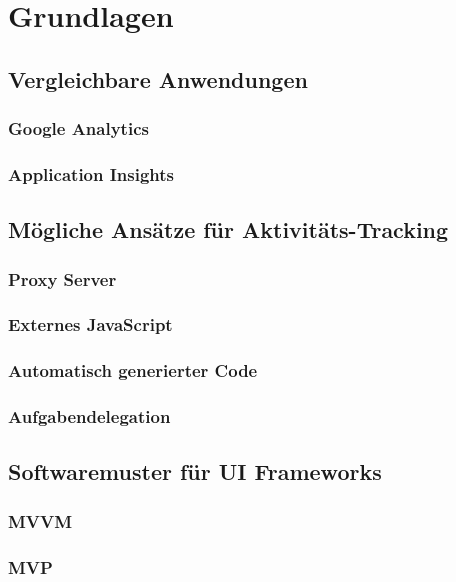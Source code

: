 \chapter{Grundlagen}
\label{cha:grundlagen}

\section{Vergleichbare Anwendungen}
\label{sec:similar_applications}

\subsection{Google Analytics}
\label{subsec:google_analytics}

\subsection{Application Insights}
\label{subsec:applications_insights}

\section{Mögliche Ansätze für Aktivitäts-Tracking}
\label{sec:solutions_tracking}

\subsection{Proxy Server}
\label{subsec:proxy_server}

\subsection{Externes JavaScript}
\label{subsec:external_js}

\subsection{Automatisch generierter Code}
\label{subsec:autogenerated_code}

\subsection{Aufgabendelegation}
\label{subsec:task_delegation}

\section{Softwaremuster für UI Frameworks}
\label{subsec:patterns}

\subsection{MVVM}
\label{subsec:mvvm}

\subsection{MVP}
\label{subsec:mvp}







